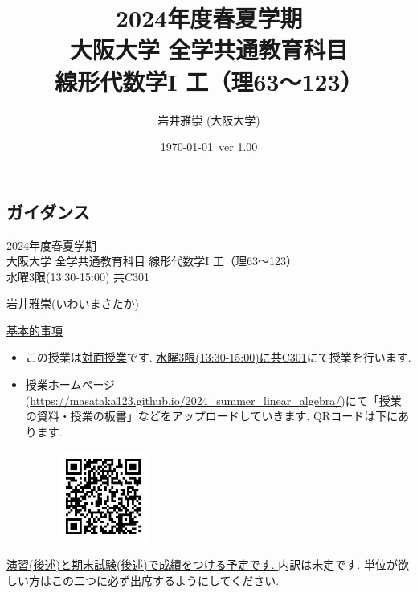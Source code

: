 \documentclass[dvipdfmx,a4paper,11pt]{article}
\title{2024年度春夏学期 \\ 大阪大学 全学共通教育科目 \\線形代数学I 工（理63〜123）}
\author{岩井雅崇 (大阪大学)}
\date{\today \, ver 1.00}
\theoremstyle{definition}
\begin{document}
\maketitle
\tableofcontents
\newpage

\begin{center}
\setcounter{section}{-1}
\section{ガイダンス}
\label{sec-guide}
\end{center}

\begin{center}
{\Large 2024年度春夏学期 \\ 大阪大学 全学共通教育科目 線形代数学I 工（理63〜123）} \\
水曜3限(13:30-15:00) 共C301
\end{center}
\begin{flushright}
 岩井雅崇(いわいまさたか) \\
\end{flushright}
{\Large \underline{基本的事項}}
\begin{itemize}
  \setlength{\parskip}{0cm} %
  \setlength{\itemsep}{0cm} %
\item この授業は\underline{対面授業}です. \underline{水曜3限(13:30-15:00)に共C301}にて授業を行います.
\item 授業ホームページ(\url{https://masataka123.github.io/2024_summer_linear_algebra/})にて「授業の資料・授業の板書」などをアップロードしていきます. 
QRコードは下にあります.
\begin{figure}[htbp]
\begin{center}
 \includegraphics[height=30mm, width=30mm]{linalg.png}
\end{center}
\end{figure}
\end{itemize}


\underline{演習(後述)と期末試験(後述)で成績をつける予定です. } 内訳は未定です. 単位が欲しい方はこの二つに必ず出席するようにしてください. 
\end{document}
